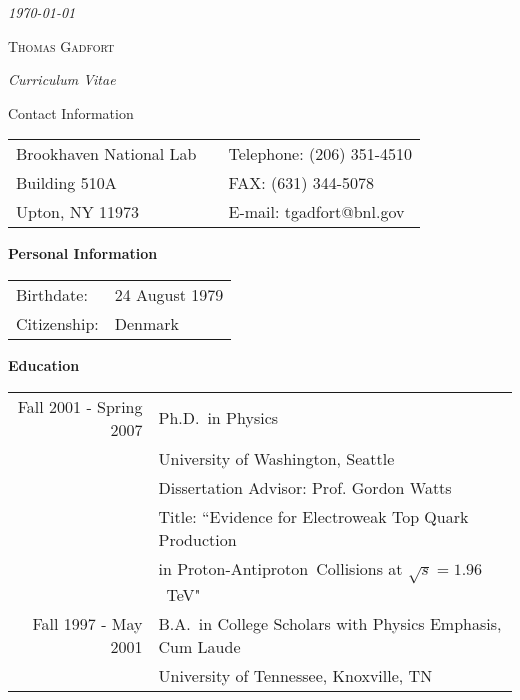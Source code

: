 \documentclass[12pt]{article}
\newcommand{\hr}{\centerline{\hskip 30mm\hrulefill\hskip 30mm}}
\begin{document}
\pagestyle{empty}

\vspace{-1cm}\hspace{12cm}{}\emph{\today}

\vspace{.5cm}

\begin{center}
{\LARGE \textsc{Thomas Gadfort}}

\vspace{-.3cm}\emph{Curriculum Vitae}

\hr

\noindent
{\sc Contact Information}

\begin{tabular}{lcl}
Brookhaven National Lab				& \hspace{3.47cm} & Telephone: (206) 351-4510 \\
Building 510A						& \hspace{2.2cm}   & FAX: (631) 344-5078  \\
Upton, NY 11973					& \hspace{2.2cm} & E-mail: tgadfort@bnl.gov \\
\end{tabular}

\end{center}

\noindent
{\Large \textbf{Personal Information}}

\begin{tabular}{ll}
Birthdate:		&	24 August 1979 \\
Citizenship:	&	Denmark \\
\end{tabular}


\noindent
{\Large \textbf{Education}}

\begin{tabular}{rl}
Fall 2001 - Spring 2007 & Ph.D.\ in Physics \\
	& University of Washington, Seattle \\
	& Dissertation Advisor: Prof. Gordon Watts \\
	& Title: ``Evidence for Electroweak Top Quark Production \\
	& in Proton-Antiproton~Collisions at $\sqrt{s} = 1.96$~TeV" \\
Fall 1997 - May 2001 & B.A.\ in College Scholars with Physics Emphasis, Cum Laude \\	
	& University of Tennessee, Knoxville, TN \\
\end{tabular}
\end{document}
